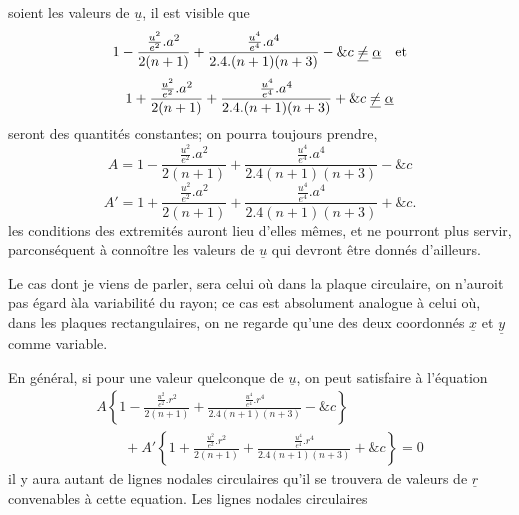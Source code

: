 \documentclass[11pt,a4paper]{article}
\begin{document}

   soient les valeurs de $\underline{u}$, il est visible que
\[ 1 - \frac{\frac{u^2}{e^2}.a^2}{2(n+1)} + \frac{\frac{u^4}{e^4}.a^4}{2.4.(n+1)(n+3)} - \&c \;\uncertain{\neq}\; \uncertain{\alpha} \quad \text{et} \]
\[ 1 + \frac{\frac{u^2}{e^2}.a^2}{2(n+1)} + \frac{\frac{u^4}{e^4}.a^4}{2.4.(n+1)(n+3)} + \&c \;\uncertain{\neq}\; \uncertain{\alpha} \]
seront des quantités constantes;   on pourra toujours
prendre,
\[ A = 1 - \frac{\frac{u^2}{e^2}.a^2}{2(n+1)} + \frac{\frac{u^4}{e^4}.a^4}{2.4(n+1)(n+3)} - \&c \]
\[ A' = 1 + \frac{\frac{u^2}{e^2}.a^2}{2(n+1)} + \frac{\frac{u^4}{e^4}.a^4}{2.4(n+1)(n+3)} + \&c. \]
   les conditions des extremités auront lieu d'elles
mêmes, et ne pourront plus servir, parconséquent à connoître
les valeurs de $\underline{u}$  qui devront être donnés d'ailleurs.

Le cas dont je viens de parler, sera celui où dans
la plaque circulaire, on n'auroit pas égard àla
variabilité du rayon; ce cas est absolument analogue
à celui où, dans les plaques rectangulaires, on
ne regarde qu'une des deux coordonnés $\underline{x}$ et $\underline{y}$ comme
variable.

En général, si pour une valeur quelconque de $\underline{u}$,
on peut satisfaire à l'équation
\[ \begin{array}{l} A\left\{1 - \frac{\frac{u^2}{e^2}.r^2}{2(n+1)} + \frac{\frac{u^4}{e^4}.r^4}{2.4(n+1)(n+3)} - \&c\right\} \\ \qquad + A'\left\{1 + \frac{\frac{u^2}{e^2}.r^2}{2(n+1)} + \frac{\frac{u^4}{e^4}.r^4}{2.4(n+1)(n+3)} + \&c\right\} = 0 \end{array} \]
il y aura autant de lignes nodales circulaires
qu'il se trouvera de valeurs de $\underline{r}$ convenables
à cette equation. Les lignes nodales circulaires
\end{document}
